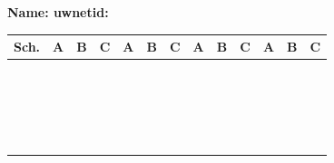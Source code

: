 \documentclass{article}
\begin{document}
{\Large\bf Name: \hspace{2.5in}    uwnetid:}\\
\renewcommand\arraystretch{1.7}%
\begin{tabular}{|p{.5in}|p{0.4in}|p{0.4in}|p{0.4in}||p{0.4in}|p{0.4in}|p{0.4in}||p{0.4in}|p{0.4in}|p{0.4in}||p{0.4in}|p{0.4in}|p{0.4in}|}
\hline
Sch.    & A & B & C & A & B & C & A & B & C & A & B & C \\ \hline
        &   &   &   &   &   &   &   &   &   &   &   &   \\ \hline
        &   &   &   &   &   &   &   &   &   &   &   &   \\ \hline
        &   &   &   &   &   &   &   &   &   &   &   &   \\ \hline
        &   &   &   &   &   &   &   &   &   &   &   &   \\ \hline
        &   &   &   &   &   &   &   &   &   &   &   &   \\ \hline
        &   &   &   &   &   &   &   &   &   &   &   &   \\ \hline
        &   &   &   &   &   &   &   &   &   &   &   &   \\ \hline
        &   &   &   &   &   &   &   &   &   &   &   &   \\ \hline
        &   &   &   &   &   &   &   &   &   &   &   &   \\ \hline
        &   &   &   &   &   &   &   &   &   &   &   &   \\ \hline
        &   &   &   &   &   &   &   &   &   &   &   &   \\ \hline
        &   &   &   &   &   &   &   &   &   &   &   &   \\ \hline
        &   &   &   &   &   &   &   &   &   &   &   &   \\ \hline
        &   &   &   &   &   &   &   &   &   &   &   &   \\ \hline
        &   &   &   &   &   &   &   &   &   &   &   &   \\ \hline
        &   &   &   &   &   &   &   &   &   &   &   &   \\ \hline
        &   &   &   &   &   &   &   &   &   &   &   &   \\ \hline
        &   &   &   &   &   &   &   &   &   &   &   &   \\ \hline
        &   &   &   &   &   &   &   &   &   &   &   &   \\ \hline
        &   &   &   &   &   &   &   &   &   &   &   &   \\ \hline

\end{tabular}
\end{document}
